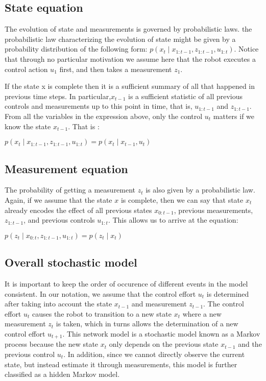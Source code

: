 \documentclass[twoside]{article}
\begin{document}
 \subsection{State equation}
 The evolution of state and measurements is governed by probabilistic laws. the probabilistic law characterizing
the evolution of state might be given by a probability distribution
of the following form: $p(x_t \mid x_{1:t-1}, z_{1:t-1}, u_{1:t})$. Notice that through no particular
motivation we assume here that the robot executes a control action $u_1$ first, and then takes a measurement $z_1$.

 If the state x is complete then it is a
sufficient summary of all that happened in previous time steps. In particular,$x_{t-1}$ is a sufficient statistic of all previous controls and measurements up to this point in time, that is, $u_{1:t-1}$ and $z_{1:t-1}$. From all the variables in the
expression above, only the control $u_t$ matters if we know the state $x_{t-1}$. That is :

\begin{center}
$p(x_t \mid x_{1:t-1}, z_{1:t-1}, u_{1:t}) = p(x_t \mid x_{t-1},u_t)$
\end{center}

\subsection{Measurement equation}
The probability of getting a measurement $z_t$ is also given by a probabilistic law. Again, if we assume that the state $x$ is complete, then we can say that state $x_t$ already encodes the effect of all previous states $x_{0:t-1}$, previous measurements, $z_{1:t-1}$, and previous controls $u_{1:t}$. This allows us to arrive at the equation:  

\begin{center}
$p(z_t \mid x_{0:t},z_{1:t-1},u_{1:t})=p(z_t\mid x_t)$
\end{center}

\subsection{Overall stochastic model}
It is important to keep the order of occurence of different events in the model consistent. In our notation, we assume that the control effort $u_t$ is determined after taking into account the state $x_{t-1}$ and measurement $z_{t-1}$. The control effort $u_t$ causes the robot to transition to a new state $x_t$ where a new measurement $z_t$ is taken, which in turns allows the determination of a new control effort $u_{t+1}$. This network model is a stochastic model known as a Markov process because the new state $x_t$ only depends on the previous state $x_{t-1}$ and the previous control $u_t$. In addition, since we cannot directly observe the current state, but instead estimate it through measurements, this model is further classified as a hidden Markov model. 
\end{document}
